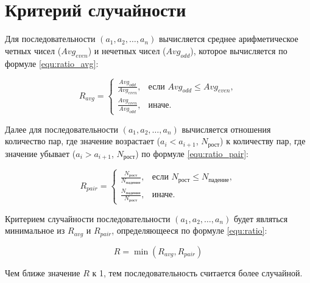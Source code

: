 \chapter{Критерий случайности}

Для последовательности $(a_1, a_2, \dots, a_n)$ вычисляется среднее арифметическое четных чисел ($Avg_{even}$) и нечетных чисел ($Avg_{odd}$), которое вычисляется по формуле \ref{equ:ratio_avg}:

\begin{equation}
	\label{equ:ratio_avg}
	R_{avg} = \begin{cases} 
		\frac{Avg_{odd}}{Avg_{even}}, & \text{если } Avg_{odd} \leq Avg_{even}, \\
		\frac{Avg_{even}}{Avg_{odd}}, & \text{иначе}.
	\end{cases}
\end{equation}

Далее для последовательности $(a_1, a_2, \dots, a_n)$  вычисляется отношения количество пар, где значение возрастает (\( a_i < a_{i+1} \), $N_{\text{рост}}$) к количеству пар, где значение убывает (\( a_i > a_{i+1} \), $N_{\text{рост}}$) по формуле \ref{equ:ratio_pair}:

\begin{equation}
	\label{equ:ratio_pair}
	R_{pair} = \begin{cases} 
		\frac{N_{\text{рост}}}{N_{\text{падение}}}, & \text{если } N_{\text{рост}} \leq N_{\text{падение}}, \\
		\frac{N_{\text{падение}}}{N_{\text{рост}}}, & \text{иначе}.
	\end{cases}
\end{equation}

Критерием случайности последовательности $(a_1, a_2, \dots, a_n)$ будет являться минимальное из $R_{avg}$ и $R_{pair}$, определяющееся по формуле \ref{equ:ratio}:

\begin{equation}
	\label{equ:ratio}
	R = \min(R_{avg}, R_{pair})
\end{equation}

Чем ближе  значение $R$ к 1, тем последовательность считается более случайной.

